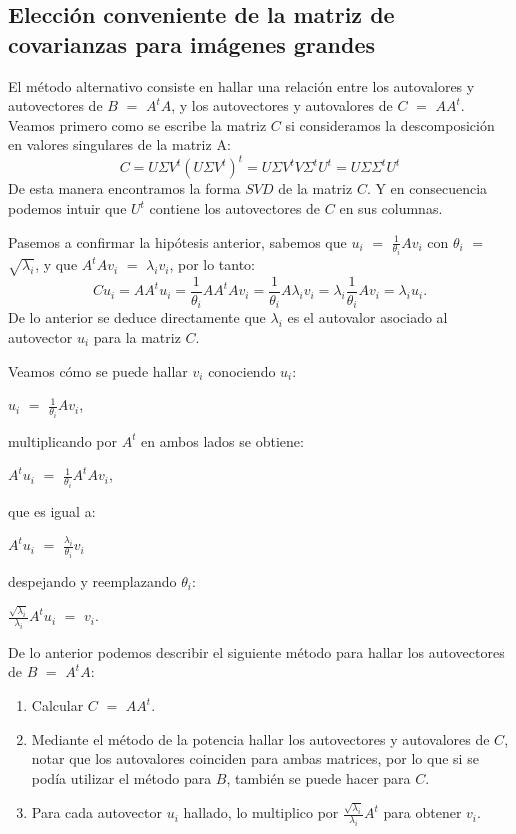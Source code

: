 \subsection{Elección conveniente de la matriz de covarianzas para imágenes grandes}

El método alternativo consiste en hallar una relación entre los autovalores y autovectores de $B$ $=$ $A^{t} A$, y los autovectores y autovalores de $C$ $=$ $A A^{t}$.
Veamos primero como se escribe la matriz $C$ si consideramos la descomposición en valores singulares de la matriz A:
\begin{equation}
C = U \Sigma V^t (U \Sigma V^t)^{t} = U \Sigma V^t V \Sigma^{t} U^{t}  = U \Sigma \Sigma^{t} U^{t} 
\end{equation}
De esta manera encontramos la forma $SVD$ de la matriz $C$. Y en consecuencia podemos intuir que $U^{t}$ contiene los autovectores de $C$ en sus columnas.

Pasemos a confirmar la hipótesis anterior, sabemos que $u_{i}$ $=$ $\frac{1}{ \theta_{i} } A v_{i}$ con $\theta_{i}$ $=$ $\sqrt{ \lambda_{i} }$, y que $A^{t} A v_{i}$ $=$ $\lambda_{i} v_{i}$, por lo tanto:
\begin{equation}
C u_{i} = A A^{t} u_{i} = \frac{1}{ \theta_{i} } A A^{t}  A v_{i} =  \frac{ 1 }{  \theta_{i} } A  \lambda_{i} v_{i} =  \lambda_{i} \frac{ 1 }{ \theta_{i} } A  v_{i} = \lambda_{i} u_{i}.
\end{equation}
De lo anterior se deduce directamente que $\lambda_{i}$ es el autovalor asociado al autovector $u_{i}$ para la matriz $C$.

Veamos cómo se puede hallar $v_{i}$ conociendo $u_{i}$:

$u_{i}$ $=$ $\frac{1}{ \theta_{i} } A v_{i}$, 

multiplicando por $A^{t}$ en ambos lados se obtiene:

$A^{t} u_{i}$ $=$ $ \frac{1}{ \theta_{i} } A^{t} A v_{i}$, 

que es igual a: 

$A^{t} u_{i}$ $=$ $\frac{\lambda_{i}}{ \theta_{i} }  v_{i}$ 

despejando y reemplazando $\theta_{i}$:

$\frac{ \sqrt{\lambda_{i} } }{ \lambda_{i} }  A^{t} u_{i}$ $=$ $v_{i}$.

De lo anterior podemos describir el siguiente método para hallar los autovectores de $B$ $=$ $A^{t} A$:
\begin{enumerate}
\setlength{\itemindent}{0.2in}
\item Calcular $C$ $=$ $A A^{t}$.
\item Mediante el método de la potencia hallar los autovectores y autovalores de $C$, notar que los autovalores coinciden para ambas matrices, por lo que si  se podía utilizar el método para $B$, también se puede hacer para $C$.
\item Para cada autovector $u_{i}$ hallado, lo multiplico por $\frac{ \sqrt{\lambda_{i} } }{ \lambda_{i} }  A^{t}$ para obtener $v_{i}$.
\end{enumerate}


